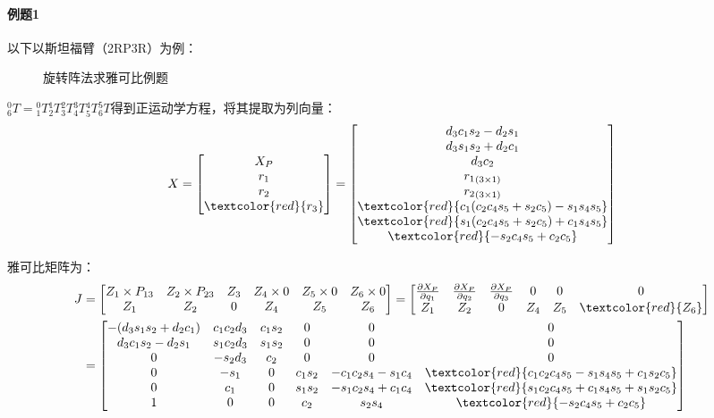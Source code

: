 \documentclass[
12pt, %
a4paper, 
oneside, %
headinclude,footinclude, %
]{scrartcl}
\begin{document}
\paragraph{例题1}
{\footnotesize
以下以斯坦福臂（2RP3R）为例：

\begin{figure}[H]
\centering
\subfloat[斯坦福臂结构图]{\texttt{[image: 4.1]}} \quad
\subfloat[参数表]{\texttt{[image: 4.2]}}
\caption[旋转阵法求雅可比例题]{旋转阵法求雅可比例题}
\end{figure}

$ _6^0T = {_1^0T}{_2^1T}{_3^2T}{_4^3T}{_5^4T}{_6^5T} $得到正运动学方程，将其提取为列向量：
$$
X = \begin{bmatrix} X_P \\ r_1 \\ r_2 \\ \textcolor{red}{r_3} \end{bmatrix}
=
\begin{bmatrix}
d_3 c_1 s_2 - d_2 s_1 \\
d_3 s_1 s_2 + d_2 c_1 \\
d_3 c_2 \\
{r_1}_{(3 \times 1)} \\
{r_2}_{(3 \times 1)} \\
\textcolor{red}{c_1(c_2 c_4 s_5 + s_2 c_5) - s_1 s_4 s_5} \\
\textcolor{red}{s_1(c_2 c_4 s_5 + s_2 c_5) + c_1 s_4 s_5} \\
\textcolor{red}{-s_2 c_4 s_5 + c_2 c_5}
\end{bmatrix}
$$

雅可比矩阵为：
\begin{align*}
J &= \begin{bmatrix} Z_1 \times P_{13} & Z_2 \times P_{23} & Z_3 & Z_4 \times 0 & Z_5 \times 0 & Z_6 \times 0 \\ Z_1 & Z_2 & 0 & Z_4 & Z_5 & Z_6 \end{bmatrix}
= \begin{bmatrix} \frac{\partial X_P}{\partial q_1} & \frac{\partial X_P}{\partial q_2} & \frac{\partial X_P}{\partial q_3} & 0 & 0 & 0 \\ Z_1 & Z_2 & 0 & Z_4 & Z_5 & \textcolor{red}{Z_6} \end{bmatrix} \\
&=
\begin{bmatrix}
-(d_3 s_1 s_2 + d_2 c_1) & c_1 c_2 d_3 & c_1 s_2 & 0 & 0 & 0 \\
d_3 c_1 s_2 - d_2 s_1 & s_1 c_2 d_3 & s_1 s_2 & 0 & 0 & 0 \\
0 & -s_2 d_3 & c_2 & 0 & 0 & 0 \\
0 & -s_1 & 0 & c_1 s_2 & -c_1 c_2 s_4 - s_1 c_4 & \textcolor{red}{c_1 c_2 c_4 s_5 - s_1 s_4 s_5 + c_1 s_2 c_5} \\
0 & c_1 & 0 & s_1 s_2 & -s_1 c_2 s_4 + c_1 c_4 & \textcolor{red}{s_1 c_2 c_4 s_5 + c_1 s_4 s_5 + s_1 s_2 c_5} \\
1 & 0 & 0 & c_2 & s_2 s_4 & \textcolor{red}{-s_2 c_4 s_5 + c_2 c_5}
\end{bmatrix}
\end{align*}

}
\end{document}
